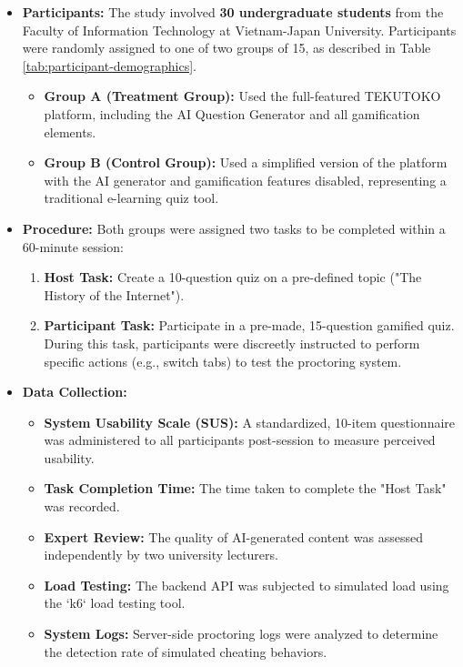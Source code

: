 \begin{itemize}
    \item \textbf{Participants:} The study involved \textbf{30 undergraduate students} from the Faculty of Information Technology at Vietnam-Japan University. Participants were randomly assigned to one of two groups of 15, as described in Table \ref{tab:participant-demographics}.
    \begin{itemize}
        \item \textbf{Group A (Treatment Group):} Used the full-featured TEKUTOKO platform, including the AI Question Generator and all gamification elements.
        \item \textbf{Group B (Control Group):} Used a simplified version of the platform with the AI generator and gamification features disabled, representing a traditional e-learning quiz tool.
    \end{itemize}

    \item \textbf{Procedure:} Both groups were assigned two tasks to be completed within a 60-minute session:
    \begin{enumerate}
        \item \textbf{Host Task:} Create a 10-question quiz on a pre-defined topic ("The History of the Internet").
        \item \textbf{Participant Task:} Participate in a pre-made, 15-question gamified quiz. During this task, participants were discreetly instructed to perform specific actions (e.g., switch tabs) to test the proctoring system.
    \end{enumerate}

    \item \textbf{Data Collection:}
    \begin{itemize}
        \item \textbf{System Usability Scale (SUS):} A standardized, 10-item questionnaire was administered to all participants post-session to measure perceived usability.
        \item \textbf{Task Completion Time:} The time taken to complete the "Host Task" was recorded.
        \item \textbf{Expert Review:} The quality of AI-generated content was assessed independently by two university lecturers.
        \item \textbf{Load Testing:} The backend API was subjected to simulated load using the `k6` load testing tool.
        \item \textbf{System Logs:} Server-side proctoring logs were analyzed to determine the detection rate of simulated cheating behaviors.
    \end{itemize}
\end{itemize}

